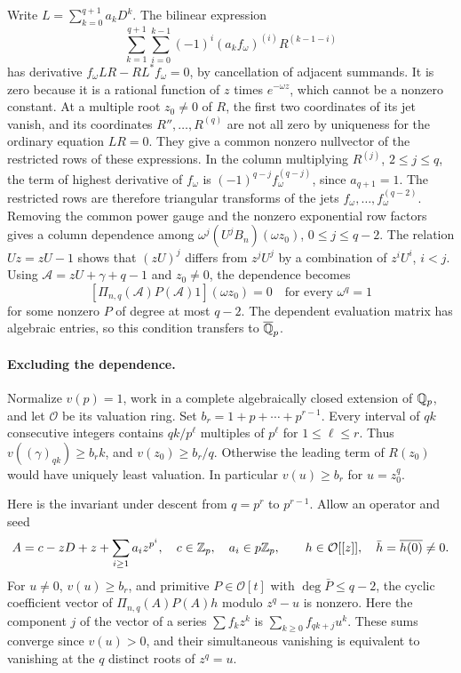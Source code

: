 Write \(L=\sum_{k=0}^{q+1}a_kD^k\). The bilinear expression
\[
 \sum_{k=1}^{q+1}\sum_{i=0}^{k-1}
 (-1)^i(a_k f_\omega)^{(i)} R^{(k-1-i)}
\]
has derivative \(f_\omega LR-RL^*f_\omega=0\), by cancellation of
adjacent summands. It is zero because it is a rational function of
\(z\) times \(e^{-\omega z}\), which cannot be a nonzero constant.
At a multiple root \(z_0\ne0\) of \(R\), the first two coordinates
of its jet vanish, and its coordinates \(R'',\ldots,R^{(q)}\)
are not all zero by uniqueness for the ordinary equation \(LR=0\).
They give a common nonzero nullvector of the restricted rows of
these expressions. In the column multiplying \(R^{(j)}\), \(2\le
j\le q\), the term of highest derivative of \(f_\omega\) is
\((-1)^{q-j}f_\omega^{(q-j)}\), since \(a_{q+1}=1\).
The restricted rows are therefore triangular transforms of the
jets \(f_\omega,\ldots,f_\omega^{(q-2)}\). Removing the common
power gauge and the nonzero exponential row factors gives a column
dependence among \(\omega^j(U^jB_n)(\omega z_0)\), \(0\le j\le q-2\).
The relation \(Uz=zU-1\) shows that \((zU)^j\) differs from
\(z^jU^j\) by a combination of \(z^iU^i\), \(i<j\).
Using \(\mathcal A=zU+\gamma+q-1\) and \(z_0\ne0\), the dependence
becomes
\[
 [\Pi_{n,q}(\mathcal A)P(\mathcal A)1](\omega z_0)=0
 \quad\text{for every }\omega^q=1
\]
for some nonzero \(P\) of degree at most \(q-2\).
The dependent evaluation matrix has algebraic entries, so this
condition transfers to \(\overline{\mathbb Q}_p\).

\paragraph{Excluding the dependence.}
Normalize \(v(p)=1\), work in a complete algebraically closed
extension of \(\mathbb Q_p\), and let \(\mathcal O\) be its valuation ring.
Set \(b_r=1+p+\cdots+p^{r-1}\). Every interval of \(qk\) consecutive
integers contains \(qk/p^\ell\) multiples of \(p^\ell\) for
\(1\le\ell\le r\). Thus \(v((\gamma)_{qk})\ge b_r k\), and
\(v(z_0)\ge b_r/q\). Otherwise the leading term of \(R(z_0)\)
would have uniquely least valuation. In particular
\(v(u)\ge b_r\) for \(u=z_0^q\).

Here is the invariant under descent from \(q=p^r\) to \(p^{r-1}\).
Allow an operator and seed
\[
 A=c-zD+z+\sum_{i\ge1}a_i z^{p^i},\quad
 c\in\mathbb Z_p,\quad a_i\in p\mathbb Z_p,\qquad
 h\in\mathcal O[[z]],\quad \bar h=\overline{h(0)}\ne0 .
\]
For \(u\ne0\), \(v(u)\ge b_r\), and primitive \(P\in\mathcal O[t]\)
with \(\deg\bar P\le q-2\), the cyclic coefficient vector of
\(\Pi_{n,q}(A)P(A)h\) modulo \(z^q-u\) is nonzero.
Here the component \(j\) of the vector of a series \(\sum f_kz^k\)
is \(\sum_{k\ge0}f_{qk+j}u^k\). These sums converge since \(v(u)>0\),
and their simultaneous vanishing is equivalent to vanishing at
the \(q\) distinct roots of \(z^q=u\).

